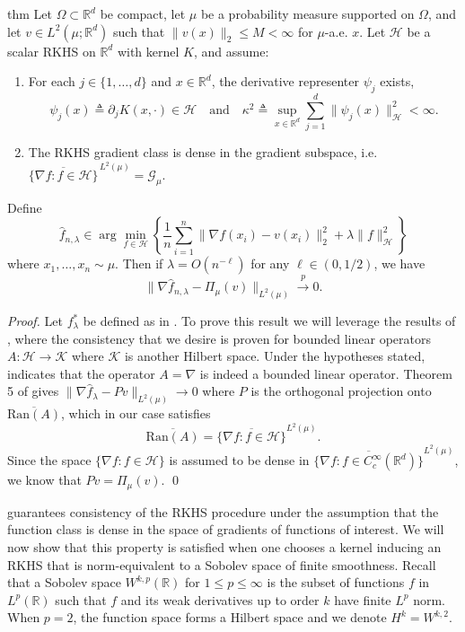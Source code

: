\documentclass[11pt]{article}
\begin{document}
\begin{restatable}{thm}{} \label{RKHS consistency}
Let $\Omega\subset \mathbb R^d$ be compact, let $\mu$ be a probability measure supported on $\Omega$, and let $v\in L^2(\mu;\mathbb R^d)$ such that $\|v(x)\|_2 \leq M < \infty$ for $\mu$-a.e. $x$. Let $\mathcal H$ be a scalar RKHS on $\mathbb{R}^d$ with kernel $K$, and assume: 
\begin{enumerate} 
    \item For each $j\in\{1,\dots,d\}$ and $x\in\mathbb{R}^d$, the derivative representer $\psi_j$ exists, \[ \psi_j(x)\triangleq \partial_{j}K(x, \cdot)\in \mathcal H \quad \text{and} \quad \kappa^2 \triangleq \sup_{x\in\mathbb{R}^d}\sum_{j=1}^d \|\psi_j(x)\|_{\mathcal H}^2 < \infty. \] 
    \item The RKHS gradient class is dense in the gradient subspace, i.e. $\overline{\{\nabla f:f\in \mathcal H\}}^{\,L^2(\mu)}=\mathcal G_\mu.$
\end{enumerate} 
Define \[ \hat f_{n,\lambda}\in \arg\min_{f\in\mathcal H} \left\{ \frac1n\sum_{i=1}^n \|\nabla f(x_i)-v(x_i)\|_2^2+\lambda\|f\|_{\mathcal H}^2 \right\}\]
where $x_1, \dots, x_n \sim \mu$. Then if $\lambda = O(n^{-\ell})$ for any $\ell \in  (0, 1/2)$, we have
\[\|\nabla \hat f_{n, \lambda} - \Pi_{\mu}(v)\|_{L^2(\mu)} \overset{p}\longrightarrow 0.\]
\end{restatable}
\noindent \textit{Proof.} Let $f^*_\lambda$ be defined as in . To prove this result we will leverage the results of \citet{de2005learning}, where the consistency that we desire is proven for bounded linear operators $A: \mathcal{H} \rightarrow \mathcal{K}$ where $\mathcal{K}$ is another Hilbert space. Under the hypotheses stated,  indicates that the operator $A = \nabla$ is indeed a bounded linear operator.
Theorem 5 of \citet{de2005learning} gives $\|\nabla \hat f_\lambda - Pv\|_{L^2(\mu)} \rightarrow 0$ where $P$ is the orthogonal projection onto $\overline{\text{Ran}(A)}$, which in our case satisfies \[\overline{\text{Ran}(A)} = \overline{\{\nabla f: f \in \mathcal{H}\}}^{L^2(\mu)}.\] 
Since the space $\{\nabla f : f \in \mathcal{H}\}$ is assumed to be dense in $\overline{\{\nabla f: f \in C^\infty_c(\mathbb{R}^d)\}}^{L^2(\mu)}$, we know that $Pv = \Pi_{\mu}(v)$. \qed{}

 guarantees consistency of the RKHS procedure under the assumption that the function class is dense in the space of gradients of functions of interest. We will now show that this property is satisfied when one chooses a kernel inducing an RKHS that is norm-equivalent to a Sobolev space of finite smoothness. Recall that a Sobolev space $W^{k, p}(\mathbb{R})$ for $1 \le p \leq \infty$ is the subset of functions $f$ in $L^p(\mathbb{R})$ such that $f$ and its weak derivatives up to order $k$ have finite $L^p$ norm. When $p = 2$, the function space forms a Hilbert space and we denote $H^k = W^{k, 2}.$ 
\end{document}
